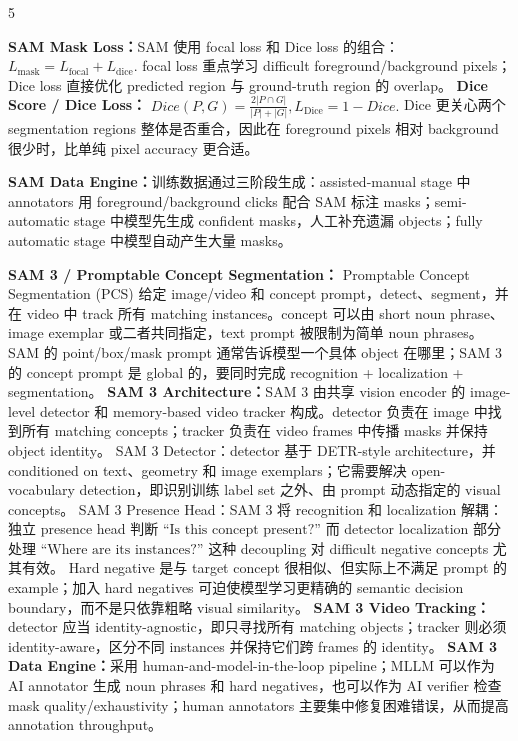 \documentclass[a4paper, landscape]{article}
\begin{document}
\begin{multicols}{5}
\par \textbf{SAM Mask Loss：}SAM 使用 focal loss 和 Dice loss 的组合：
\(
L_{\mathrm{mask}}
=
L_{\mathrm{focal}}+L_{\mathrm{dice}}.
\)
focal loss 重点学习 difficult foreground/background pixels；Dice loss 直接优化 predicted region 与 ground-truth region 的 overlap。
\textbf{Dice Score / Dice Loss：}
\(
Dice(P,G)=
\frac{2|P\cap G|}{|P|+|G|},
L_{\mathrm{Dice}}=1-Dice.
\)
Dice 更关心两个 segmentation regions 整体是否重合，因此在 foreground pixels 相对 background 很少时，比单纯 pixel accuracy 更合适。

\par \textbf{SAM Data Engine：}训练数据通过三阶段生成：assisted-manual stage 中 annotators 用 foreground/background clicks 配合 SAM 标注 masks；semi-automatic stage 中模型先生成 confident masks，人工补充遗漏 objects；fully automatic stage 中模型自动产生大量 masks。

\par \textbf{SAM 3 / Promptable Concept Segmentation：} Promptable Concept Segmentation (PCS) 给定 image/video 和 concept prompt，detect、segment，并在 video 中 track 所有 matching instances。concept 可以由 short noun phrase、image exemplar 或二者共同指定，text prompt 被限制为简单 noun phrases。SAM 的 point/box/mask prompt 通常告诉模型一个具体 object 在哪里；SAM 3 的 concept prompt 是 global 的，要同时完成 recognition + localization + segmentation。
\textbf{SAM 3 Architecture：}SAM 3 由共享 vision encoder 的 image-level detector 和 memory-based video tracker 构成。detector 负责在 image 中找到所有 matching concepts；tracker 负责在 video frames 中传播 masks 并保持 object identity。
SAM 3 Detector：detector 基于 DETR-style architecture，并 conditioned on text、geometry 和 image exemplars；它需要解决 open-vocabulary detection，即识别训练 label set 之外、由 prompt 动态指定的 visual concepts。
SAM 3 Presence Head：SAM 3 将 recognition 和 localization 解耦：独立 presence head 判断
\(
\text{``Is this concept present?''}
\)
而 detector localization 部分处理
\(
\text{``Where are its instances?''}
\)
这种 decoupling 对 difficult negative concepts 尤其有效。
Hard negative 是与 target concept 很相似、但实际上不满足 prompt 的 example；加入 hard negatives 可迫使模型学习更精确的 semantic decision boundary，而不是只依靠粗略 visual similarity。
\textbf{SAM 3 Video Tracking：}detector 应当 identity-agnostic，即只寻找所有 matching objects；tracker 则必须 identity-aware，区分不同 instances 并保持它们跨 frames 的 identity。
\textbf{SAM 3 Data Engine：}采用 human-and-model-in-the-loop pipeline；MLLM 可以作为 AI annotator 生成 noun phrases 和 hard negatives，也可以作为 AI verifier 检查 mask quality/exhaustivity；human annotators 主要集中修复困难错误，从而提高 annotation throughput。


\end{multicols}
\end{document}

